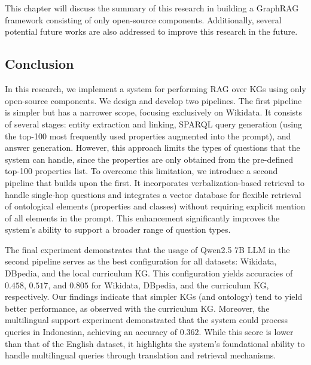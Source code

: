 \chapter{\kesimpulan}
\label{bab:6}
This chapter will discuss the summary of this research in building a GraphRAG framework consisting of only open-source components. Additionally, several potential future works are also addressed to improve this research in the future.

\section{Conclusion}
In this research, we implement a system for performing RAG over KGs using only open-source components. We design and develop two pipelines. The first pipeline is simpler but has a narrower scope, focusing exclusively on Wikidata. It consists of several stages: entity extraction and linking, SPARQL query generation (using the top-100 most frequently used properties augmented into the prompt), and answer generation. However, this approach limits the types of questions that the system can handle, since the properties are only obtained from the pre-defined top-100 properties list. To overcome this limitation, we introduce a second pipeline that builds upon the first. It incorporates verbalization-based retrieval to handle single-hop questions and integrates a vector database for flexible retrieval of ontological elements (properties and classes) without requiring explicit mention of all elements in the prompt. This enhancement significantly improves the system's ability to support a broader range of question types.

The final experiment demonstrates that the usage of Qwen2.5 7B LLM in the second pipeline serves as the best configuration for all datasets: Wikidata, DBpedia, and the local curriculum KG. This configuration yields accuracies of $0.458$, $0.517$, and $0.805$ for Wikidata, DBpedia, and the curriculum KG, respectively. Our findings indicate that simpler KGs (and ontology) tend to yield better performance, as observed with the curriculum KG. Moreover, the multilingual support experiment demonstrated that the system could process queries in Indonesian, achieving an accuracy of $0.362$. While this score is lower than that of the English dataset, it highlights the system's foundational ability to handle multilingual queries through translation and retrieval mechanisms.

